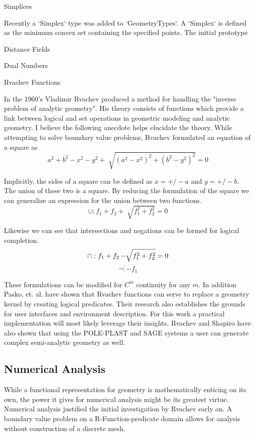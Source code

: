 \documentclass[a4paper]{article}
\begin{document}
 Simplices

Recently a `Simplex` type was added to `GeometryTypes`. A `Simplex` is defined
as the minimum convex set containing the specified points. The initial
prototype


 Distance Fields



 Dual Numbers


 Rvachev Functions


In the 1960's Vladimir Rvachev produced a method for handling the "inverse
problem of analytic geometry". His theory consists of functions which provide a
link between logical and set operations in geometric modeling and analytic
geometry.\cite{shapiro1991theory} I believe the following anecdote helps
elucidate the theory. While attempting to solve boundary value problems,
Rvachev formulated an equation of a square as
\begin{equation*}
a^2 + b^2 − x^2 − y^2 + \sqrt[]{( a^2 − x^2 )^2 +( b^2 − y^2 )^2} =0
\end{equation*}

Implicitly, the sides of a square can be defined as $x= +/- a$ and $y= +/- b$.
The union of these two is a square. By reducing the formulation of the square
we can generalize an expression for the union between two functions.
\begin{equation*}
\cup : f_1 + f_2 + \sqrt[]{f_1^2 +f_2^2} =0
\end{equation*}

Likewise we can see that intersections and negations can be formed for logical
completion.
\begin{equation*}
\cap : f_1 + f_2 - \sqrt[]{f_1^2 +f_2^2} =0 \\
\end{equation*}
\begin{equation*}
\neg : -f_1
\end{equation*}

These formulations can be modified for $C^m$ continuity for any $m$.
\cite{shapiro2007semi} In addition Pasko, et. al. have shown that Rvachev
functions can serve to replace a geometry kernel by creating logical
predicates. \cite{pasko1995function} Their research also establishes the
grounds for user interfaces and environment description. For this work a
practical implementation will most likely leverage their insights.
Rvachev and Shapiro have also shown that using the POLE-PLAST and SAGE
systems a user can generate complex semi-analytic geometry
as well.\cite{rvachev2000completeness} 
\subsection{Numerical Analysis}
While a functional representation for geometry is mathematically enticing on
its own, the power it gives for numerical analysis might be its greatest
virtue. Numerical analysis justified the initial investigation by Rvachev
early on. A boundary value problem on a R-Function-predicate domain allows
for analysis without construction of a discrete mesh.\cite{rvachev2000completeness}
\end{document}
